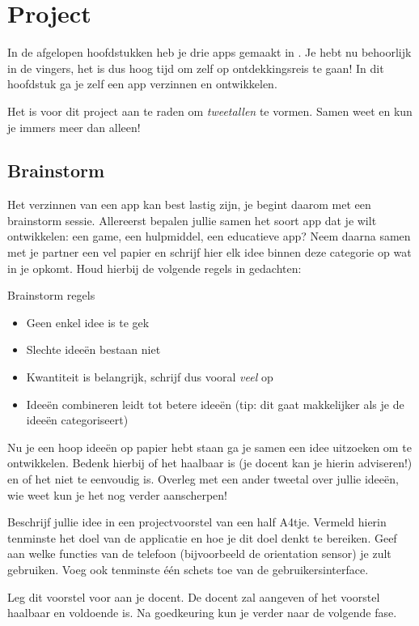 \chapter{Project}

In de afgelopen hoofdstukken heb je drie apps gemaakt in \ai. Je hebt \ai nu behoorlijk in de vingers, het is dus hoog tijd om zelf op ontdekkingsreis te gaan! In dit hoofdstuk ga je zelf een app verzinnen en ontwikkelen. 

Het is voor dit project aan te raden om \emph{tweetallen} te vormen. Samen weet en kun je immers meer dan alleen!

\section{Brainstorm}
Het verzinnen van een app kan best lastig zijn, je begint daarom met een brainstorm sessie. Allereerst bepalen jullie samen het soort app dat je wilt ontwikkelen: een game, een hulpmiddel, een educatieve app? Neem daarna samen met je partner een vel papier en schrijf hier elk idee binnen deze categorie op wat in je opkomt. Houd hierbij de volgende regels in gedachten:

\begin{derivation}{Brainstorm regels}
	\begin{itemize}
		\item Geen enkel idee is te gek
		\item Slechte idee\"en bestaan niet
		\item Kwantiteit is belangrijk, schrijf dus vooral \emph{veel} op
		\item Idee\"en combineren leidt tot betere idee\"en (tip: dit gaat makkelijker als je de idee\"en categoriseert)
	\end{itemize}
\end{derivation}

Nu je een hoop idee\"en op papier hebt staan ga je samen een idee uitzoeken om te ontwikkelen. Bedenk hierbij of het haalbaar is (je docent kan je hierin adviseren!) en of het niet te eenvoudig is. Overleg met een ander tweetal over jullie idee\"en, wie weet kun je het nog verder aanscherpen! 

\begin{opgave}
	\opgVraag
	Beschrijf jullie idee in een projectvoorstel van een half A4tje. Vermeld hierin tenminste het doel van de applicatie en hoe je dit doel denkt te bereiken. Geef aan welke functies van de telefoon (bijvoorbeeld de orientation sensor) je zult gebruiken. Voeg ook tenminste \'e\'en schets toe van de gebruikersinterface.
	
	Leg dit voorstel voor aan je docent. De docent zal aangeven of het voorstel haalbaar en voldoende is. Na goedkeuring kun je verder naar de volgende fase.
\end{opgave} 

